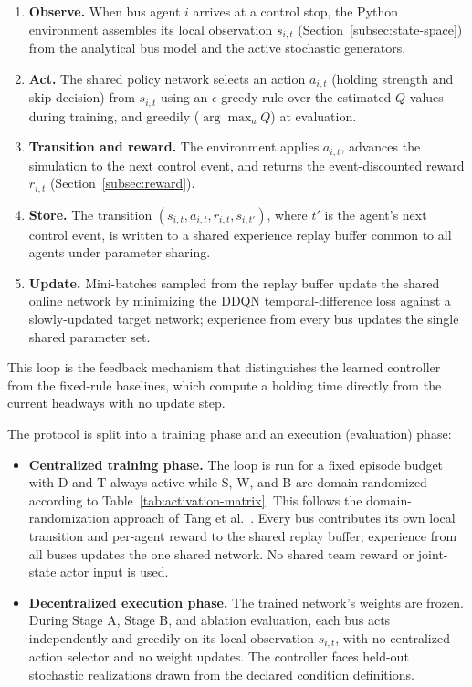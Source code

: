 \begin{enumerate}
\item \textbf{Observe.} When bus agent $i$ arrives at a control stop, the Python environment assembles its local observation $s_{i,t}$ (Section~\ref{subsec:state-space}) from the analytical bus model and the active stochastic generators.
\item \textbf{Act.} The shared policy network selects an action $a_{i,t}$ (holding strength and skip decision) from $s_{i,t}$ using an $\epsilon$-greedy rule over the estimated $Q$-values during training, and greedily ($\arg\max_a Q$) at evaluation.
\item \textbf{Transition and reward.} The environment applies $a_{i,t}$, advances the simulation to the next control event, and returns the event-discounted reward $r_{i,t}$ (Section~\ref{subsec:reward}).
\item \textbf{Store.} The transition $(s_{i,t}, a_{i,t}, r_{i,t}, s_{i,t'})$, where $t'$ is the agent's next control event, is written to a shared experience replay buffer common to all agents under parameter sharing.
\item \textbf{Update.} Mini-batches sampled from the replay buffer update the shared online network by minimizing the DDQN temporal-difference loss against a slowly-updated target network; experience from every bus updates the single shared parameter set.
\end{enumerate}

This loop is the feedback mechanism that distinguishes the learned controller from the fixed-rule baselines, which compute a holding time directly from the current headways with no update step.

The protocol is split into a training phase and an execution (evaluation) phase:

\begin{itemize}
\item \textbf{Centralized training phase.} The loop is run for a fixed episode budget with D and T always active while S, W, and B are domain-randomized according to Table~\ref{tab:activation-matrix}. This follows the domain-randomization approach of Tang et al.~\cite{Tang2024Curriculum}. Every bus contributes its own local transition and per-agent reward to the shared replay buffer; experience from all buses updates the one shared network. No shared team reward or joint-state actor input is used.

\item \textbf{Decentralized execution phase.} The trained network's weights are frozen. During Stage A, Stage B, and ablation evaluation, each bus acts independently and greedily on its local observation $s_{i,t}$, with no centralized action selector and no weight updates. The controller faces held-out stochastic realizations drawn from the declared condition definitions.
\end{itemize}

